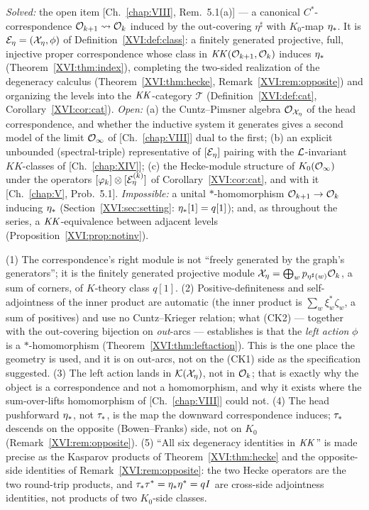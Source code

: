 \begin{remark}\label{XVI:rem:scope}
\emph{Solved:} the open item [Ch.~\ref{chap:VIII}, Rem.~5.1(a)] --- a canonical $C^*$-correspondence
$\mathcal{O}_{k+1}\rightsquigarrow\mathcal{O}_k$ induced by the out-covering $\eta^{\sharp}$ with $K_0$-map
$\eta_*$. It is $\mathcal{E}_\eta=(\mathcal{X}_\eta,\phi)$ of Definition~\ref{XVI:def:class}: a finitely generated
projective, full, injective proper correspondence whose class in $\mathit{KK}(\mathcal{O}_{k+1},\mathcal{O}_k)$
induces $\eta_*$ (Theorem~\ref{XVI:thm:index}), completing the two-sided realization of the
degeneracy calculus (Theorem~\ref{XVI:thm:hecke}, Remark~\ref{XVI:rem:opposite}) and organizing the
levels into the $\mathit{KK}$-category $\mathcal{T}$ (Definition~\ref{XVI:def:cat},
Corollary~\ref{XVI:cor:cat}). \emph{Open:} (a) the Cuntz--Pimsner algebra
$\mathcal{O}_{\mathcal{X}_\eta}$ of the head correspondence, and whether the inductive system it generates
gives a second model of the limit $\mathcal{O}_\infty$ of [Ch.~\ref{chap:VIII}] dual to the first; (b) an
explicit unbounded (spectral-triple) representative of $[\mathcal{E}_\eta]$ pairing with the
$\mathcal{L}$-invariant $KK$-classes of [Ch.~\ref{chap:XIV}]; (c) the Hecke-module structure of $K_0(\mathcal{O}_\infty)$
under the operators $[\varphi_k]\otimes[\mathcal{E}_\eta^{(k)}]$ of Corollary~\ref{XVI:cor:cat}, and with
it [Ch.~\ref{chap:V}, Prob.~5.1]. \emph{Impossible:} a unital $*$-homomorphism $\mathcal{O}_{k+1}\to\mathcal{O}_k$
inducing $\eta_*$ (Section~\ref{XVI:sec:setting}: $\eta_*[1]=q[1]$); and, as throughout the series, a
$\mathit{KK}$-equivalence between adjacent levels (Proposition~\ref{XVI:prop:notinv}).
\end{remark}

\begin{remark}\label{XVI:rem:corrections}
(1) The correspondence's right module is not ``freely generated by the graph's
generators''; it is the finitely generated projective module
$\mathcal{X}_\eta=\bigoplus_{w}p_{\eta^{\sharp}(w)}\mathcal{O}_k$, a sum of corners, of $K$-theory class
$q[1]$. (2) Positive-definiteness and self-adjointness of the inner product are automatic
(the inner product is $\sum_w\xi_w^{*}\zeta_w$, a sum of positives) and use no
Cuntz--Krieger relation; what (CK2) --- together with the out-covering bijection on
\emph{out}-arcs --- establishes is that the \emph{left action} $\phi$ is a
$*$-homomorphism (Theorem~\ref{XVI:thm:leftaction}). This is the one place the geometry is
used, and it is on out-arcs, not on the (CK1) side as the specification suggested. (3) The
left action lands in $\mathcal{K}(\mathcal{X}_\eta)$, not in $\mathcal{O}_k$; that is exactly why the object is a
correspondence and not a homomorphism, and why it exists where the sum-over-lifts
homomorphism of [Ch.~\ref{chap:VIII}] could not. (4) The head pushforward $\eta_*$, not $\tau_*$, is the map the
downward correspondence induces; $\tau_*$ descends on the opposite (Bowen--Franks) side, not on
$K_0$ (Remark~\ref{XVI:rem:opposite}). (5) ``All six degeneracy identities in $\mathit{KK}$'' is made
precise as the Kasparov products of Theorem~\ref{XVI:thm:hecke} and the opposite-side identities
of Remark~\ref{XVI:rem:opposite}: the two Hecke operators are the two round-trip products, and
$\tau_*\tau^*=\eta_*\eta^*=qI$ are cross-side adjointness identities, not products of two
$K_0$-side classes.
\end{remark}

